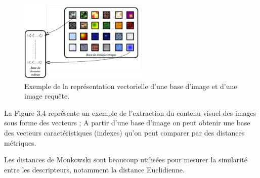 \begin{figure}[H]
	\centering
	\includegraphics[width=0.55\textwidth]{Figures/horsligne.png} %
	\caption{Exemple de la représentation vectorielle d'une base d'image et d'une image requête.}
\end{figure}
La Figure 3.4 représente un exemple de l’extraction du contenu visuel des images sous forme des vecteurs ; A partir d’une base d’image on peut obtenir une base des vecteurs caractéristiques (indexes) qu’on peut comparer par des distances métriques.

Les distances de Monkowski sont beaucoup utilisées pour mesurer la similarité entre les descripteurs, notamment la distance Euclidienne. 

%
%

